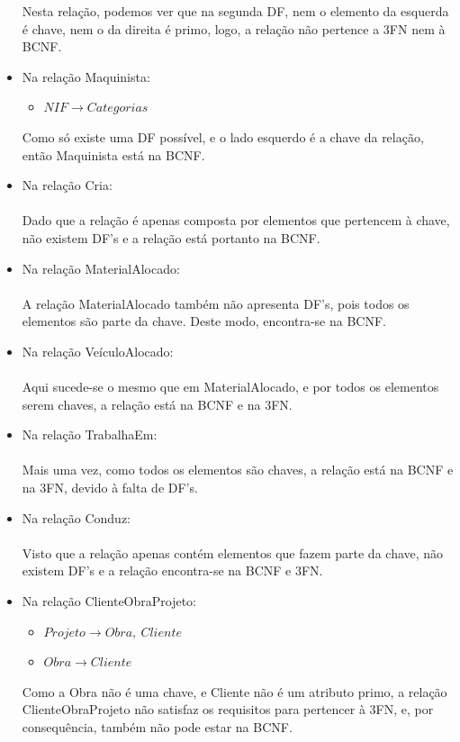 \documentclass{report}
\begin{document}
\begin{itemize}
			Nesta relação, podemos ver que na segunda DF, nem o elemento da esquerda é chave, 
			nem o da direita é primo, logo, a relação não pertence a 3FN nem à BCNF.
			
			\item Na relação Maquinista:
			\begin{itemize}
				\item $NIF \rightarrow Categorias$
			\end{itemize}
			
			Como só existe uma DF possível, e o lado esquerdo é a chave da relação, então 
			Maquinista está na BCNF.
			
			\item Na relação Cria:
			\\ \\
			Dado que a relação é apenas composta por elementos que pertencem  à chave, não 
			existem DF’s e a relação está portanto na BCNF.
			
			\item Na relação MaterialAlocado:
			\\ \\
			A relação MaterialAlocado também não apresenta DF’s, pois todos os elementos são 
			parte da chave. Deste modo, encontra-se na BCNF.
			
			\item Na relação VeículoAlocado:
			\\ \\
			Aqui sucede-se o mesmo que em MaterialAlocado, e por todos os elementos serem 
			chaves, a relação está na BCNF e na 3FN.
			
			\item Na relação TrabalhaEm:
			\\ \\
			Mais uma vez, como todos os elementos são chaves, a relação está na BCNF e na 3FN, 
			devido à falta de DF’s.
			
			\item Na relação Conduz:
			\\ \\
			Visto que a relação apenas contém elementos que fazem parte da chave, não existem 
			DF’s e a relação encontra-se na BCNF e 3FN.
			
			\item Na relação ClienteObraProjeto:
			\begin{itemize}
				\item $Projeto \rightarrow Obra,\ Cliente$
				\item $Obra \rightarrow Cliente$
			\end{itemize}
			
			Como a Obra não é uma chave, e Cliente não é um atributo primo, a relação 
			ClienteObraProjeto não satisfaz os requisitos para pertencer à 3FN, e, por 
			consequência, também não pode estar na BCNF.
		\end{itemize}
		
\end{document}
